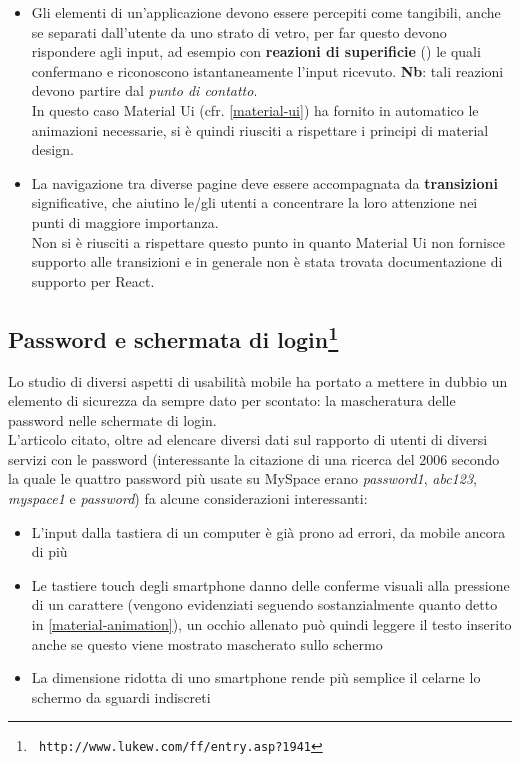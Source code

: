 \begin{itemize}
\item Gli elementi di un'applicazione devono essere percepiti come tangibili, anche
se separati dall'utente da uno strato di vetro, per far questo devono rispondere agli
input, ad esempio con \textbf{reazioni di superificie} (\textit{})
le quali confermano
e riconoscono istantaneamente l'input ricevuto. \textbf{Nb}: tali reazioni devono
partire dal \textit{punto di contatto}. \\
In questo caso Material Ui (cfr. \ref{material-ui}) ha fornito in automatico le animazioni
necessarie, si è quindi riusciti a rispettare i principi di material design.
\item La navigazione tra diverse pagine deve essere accompagnata da
\textbf{transizioni} significative, che aiutino le/gli utenti a concentrare la loro
attenzione nei punti di maggiore importanza. \\
Non si è riusciti a rispettare questo punto in quanto Material Ui non fornisce supporto
alle transizioni e in generale non è stata trovata documentazione di supporto per
React.
\end{itemize}

\subsection[Password e schermata di login]{Password e schermata di login\footnote{\texttt{ http://www.lukew.com/ff/entry.asp?1941}}}

Lo studio di diversi aspetti di usabilità mobile ha portato a mettere in dubbio un elemento
di sicurezza da sempre dato per scontato: la mascheratura delle password nelle schermate di
login. \\
L'articolo citato, oltre ad elencare diversi dati sul rapporto di utenti di diversi servizi
con le password (interessante la citazione di una ricerca del 2006 secondo la quale le quattro
password più usate su MySpace erano \textit{password1}, \textit{abc123}, \textit{myspace1} e
\textit{password}) fa alcune considerazioni interessanti:

\begin{itemize}
\item L'input dalla tastiera di un computer è già prono ad errori, da mobile ancora di più
\item Le tastiere touch degli smartphone danno delle conferme visuali alla pressione di un
carattere (vengono evidenziati seguendo sostanzialmente quanto detto in \ref{material-animation}),
un occhio allenato può quindi leggere il testo inserito anche se questo viene mostrato
mascherato sullo schermo
\item La dimensione ridotta di uno smartphone rende più semplice il celarne lo schermo
da sguardi indiscreti
\end{itemize}

